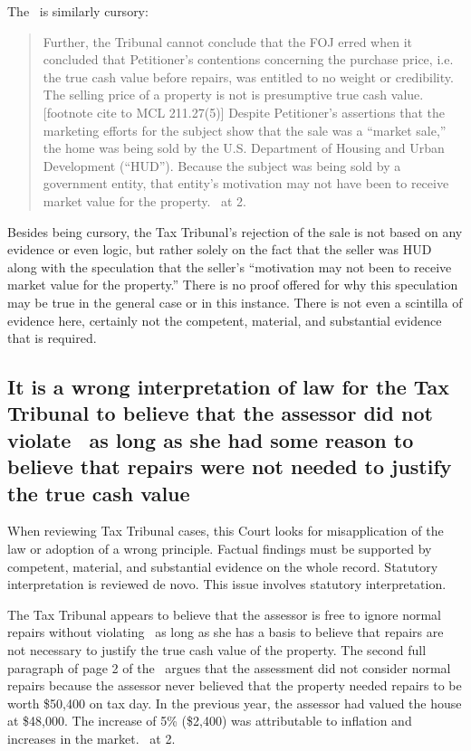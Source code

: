 \documentclass[12pt,\documentclassflag]{michiganCourtOfAppealsBrief}
\def\mathieuGast{\pincite[l]{MCL}{211.27(2)}}
\begin{document}
The \orderDenying\ is similarly cursory:

\begin{quote}
	Further, the Tribunal cannot conclude that the FOJ erred when it	concluded that Petitioner's contentions concerning the purchase price, i.e. the true cash value before repairs, was entitled to no weight or credibility. The selling price of a property is not is presumptive true cash value. [footnote cite to MCL 211.27(5)] Despite Petitioner's assertions that the marketing efforts for the subject show that the sale was a ``market sale,'' the home was being sold by the U.S. Department of Housing and Urban Development (``HUD''). Because the subject was being sold by a government entity, that entity's motivation may not have been to receive market value for the property. \orderDenying\ at 2.
\end{quote}

Besides being cursory, the Tax Tribunal's rejection of the sale is not based on any evidence or even logic, but rather solely on the fact that the seller was HUD along with the speculation that the seller's ``motivation may not been to receive market value for the property.'' There is no proof offered for why this speculation may be true in the general case or in this instance. There is not even a scintilla of evidence here, certainly not the competent, material, and substantial evidence that is required.

\subsection{It is a wrong interpretation of law for the Tax Tribunal to believe that the assessor did not violate \mathieuGast\ as long as she had some reason to believe that repairs were not needed to justify the true cash value}

When reviewing Tax Tribunal cases, this Court looks for misapplication of the law or adoption of a wrong principle. Factual findings must be supported by competent, material, and substantial evidence on the whole record. Statutory interpretation is reviewed de novo.  This issue involves statutory interpretation.

The Tax Tribunal appears to believe that the assessor is free to ignore  normal repairs without violating \mathieuGast\ as long as she has a basis to believe that repairs are not necessary to justify the true cash value of the property. The second full paragraph of page 2 of the \orderDenying\ argues that the assessment did not consider normal repairs because the assessor never believed that the property needed repairs to be worth \$50,400 on tax day. In the previous year, the assessor had valued the house at \$48,000. The increase of 5\% (\$2,400) was attributable to inflation and increases in the market. \orderDenying\ at 2.
\end{document}
